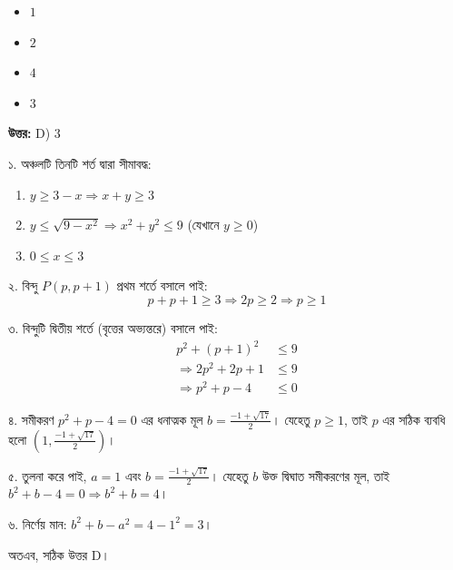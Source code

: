 \documentclass[12pt, a4paper]{article}
\begin{document}
\begin{itemize}[label={}, leftmargin=1cm, itemsep=0.5em]
    \item[\textbf{A)}] $1$
    \item[\textbf{B)}] $2$
    \item[\textbf{C)}] $4$
    \item[\textbf{D)}] $3$
\end{itemize}

\vspace{0.5em}
\begin{tcolorbox}[answerbox]
    \textbf{\color{success} উত্তর:} D) $3$
\end{tcolorbox}
\vspace{1em}

\begin{tcolorbox}[solutionbox={সমাধান (Solution)}]
    \noindent
    ১. অঞ্চলটি তিনটি শর্ত দ্বারা সীমাবদ্ধ:
    \begin{enumerate}[label=(\roman*)]
        \item $y \ge 3 - x \Rightarrow x + y \ge 3$
        \item $y \le \sqrt{9 - x^2} \Rightarrow x^2 + y^2 \le 9$ (যেখানে $y \ge 0$)
        \item $0 \le x \le 3$
    \end{enumerate}
    
    \vspace{0.5em}
    ২. বিন্দু $P(p, p+1)$ প্রথম শর্তে বসালে পাই:
    \[ p + p + 1 \ge 3 \Rightarrow 2p \ge 2 \Rightarrow p \ge 1 \]
    
    \vspace{0.5em}
    ৩. বিন্দুটি দ্বিতীয় শর্তে (বৃত্তের অভ্যন্তরে) বসালে পাই:
    \begin{align*}
        p^2 + (p + 1)^2 &\le 9 \\
        \Rightarrow 2p^2 + 2p + 1 &\le 9 \\
        \Rightarrow p^2 + p - 4 &\le 0
    \end{align*}
    
    \vspace{0.5em}
    ৪. সমীকরণ $p^2 + p - 4 = 0$ এর ধনাত্মক মূল $b = \frac{-1 + \sqrt{17}}{2}$। যেহেতু $p \ge 1$, তাই $p$ এর সঠিক ব্যবধি হলো $\left(1, \frac{-1 + \sqrt{17}}{2}\right)$।
    
    \vspace{0.5em}
    ৫. তুলনা করে পাই, $a = 1$ এবং $b = \frac{-1 + \sqrt{17}}{2}$। যেহেতু $b$ উক্ত দ্বিঘাত সমীকরণের মূল, তাই $b^2 + b - 4 = 0 \Rightarrow b^2 + b = 4$।
    
    \vspace{0.5em}
    ৬. নির্ণেয় মান: $b^2 + b - a^2 = 4 - 1^2 = 3$।
    
    \vspace{0.5em}
    অতএব, সঠিক উত্তর D।
\end{tcolorbox}
\end{document}
